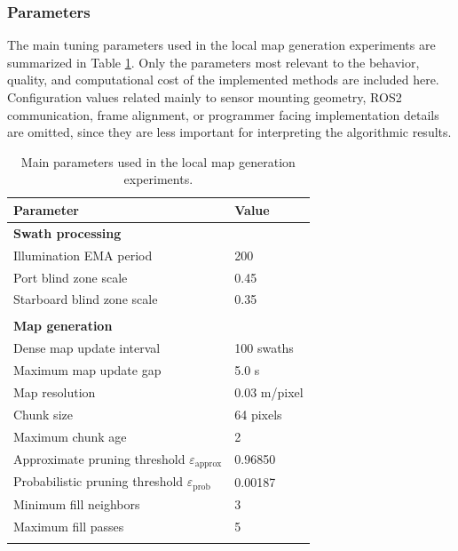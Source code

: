 \subsubsection{Parameters}
The main tuning parameters used in the local map generation experiments are summarized in Table \ref{tab:local-map-generation-parameters}. Only the parameters most relevant to the behavior, quality, and computational cost of the implemented methods are included here. Configuration values related mainly to sensor mounting geometry, ROS2 communication, frame alignment, or programmer facing implementation details are omitted, since they are less important for interpreting the algorithmic results.
\begin{table}[H]
    \centering
    \caption{Main parameters used in the local map generation experiments.}
    \label{tab:local-map-generation-parameters}
    \begin{tabular}{l l}
        \hline
        Parameter & Value \\
        \hline

        \multicolumn{2}{l}{\textbf{Swath processing}} \\
        Illumination EMA period & 200 \\
        Port blind zone scale & 0.45 \\
        Starboard blind zone scale & 0.35 \\
        \\[-0.6em]

        \multicolumn{2}{l}{\textbf{Map generation}} \\
        Dense map update interval & 100 swaths \\
        Maximum map update gap & 5.0 s \\
        Map resolution & 0.03 m/pixel \\
        Chunk size & 64 pixels \\
        Maximum chunk age & 2 \\
        Approximate pruning threshold $\varepsilon_{\mathrm{approx}}$ & 0.96850 \\
        Probabilistic pruning threshold $\varepsilon_{\mathrm{prob}}$ & 0.00187 \\
        Minimum fill neighbors & 3 \\
        Maximum fill passes & 5 \\
        \\[-0.6em]


\end{tabular}
\end{table}
